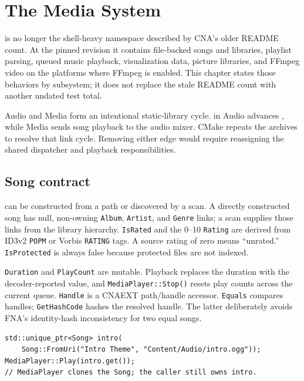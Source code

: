 \chapter{The Media System}
\label{ch:media-system}

 is no longer the shell-heavy namespace described by CNA's older README count.
At the pinned revision it contains file-backed songs and libraries, playlist parsing, queued
music playback, visualization data, picture libraries, and FFmpeg video on the platforms where
FFmpeg is enabled. This chapter states those behaviors by subsystem; it does not replace the
stale README count with another undated test total.

Audio and Media form an intentional static-library cycle.  in
Audio advances , while Media sends song playback to the audio mixer.
CMake repeats the archives to resolve that link cycle. Removing either edge would require
reassigning the shared dispatcher and playback responsibilities.

\section{Song contract}

 can be constructed from a path or discovered by a
 scan. A directly constructed song has null, non-owning
\texttt{Album}, \texttt{Artist}, and \texttt{Genre} links; a scan supplies those links from
the library hierarchy. \texttt{IsRated} and the 0--10 \texttt{Rating} are derived from ID3v2
\texttt{POPM} or Vorbis \texttt{RATING} tags. A source rating of zero means ``unrated.''
\texttt{IsProtected} is always false because protected files are not indexed.

\texttt{Duration} and \texttt{PlayCount} are mutable. Playback replaces the duration with the
decoder-reported value, and \texttt{MediaPlayer::Stop()} resets play counts across the current
queue. \texttt{Handle} is a CNAEXT path/handle accessor. \texttt{Equals} compares handles;
\texttt{GetHashCode} hashes the resolved handle. The latter deliberately avoids FNA's
identity-hash inconsistency for two equal songs.

\begin{lstlisting}
std::unique_ptr<Song> intro(
    Song::FromUri("Intro Theme", "Content/Audio/intro.ogg"));
MediaPlayer::Play(intro.get());
// MediaPlayer clones the Song; the caller still owns intro.
\end{lstlisting}

